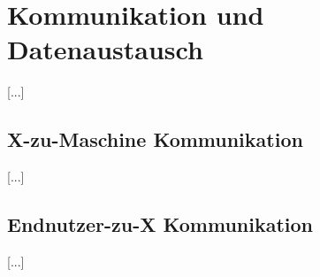 \section{Kommunikation und Datenaustausch}
\label{sec:kommunikation}

[...]

\subsection{X-zu-Maschine Kommunikation}
\label{subsec:kommunikation_x2maschine}

[...]

\subsection{Endnutzer-zu-X Kommunikation}
\label{subsec:kommunikation_endnutzer2x}

[...]
